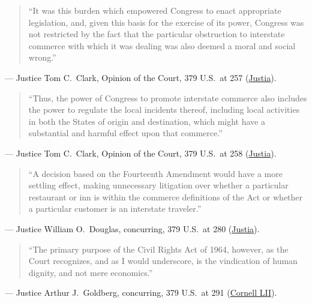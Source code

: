\documentclass[12pt]{article}
\begin{document}
\begin{quote}
``It was this burden which empowered Congress to enact appropriate legislation, and, given this basis for the exercise of its power, Congress was not restricted by the fact that the particular obstruction to interstate commerce with which it was dealing was also deemed a moral and social wrong.''
\end{quote}
\noindent --- Justice Tom C.\ Clark, Opinion of the Court, 379 U.S.\ at 257 (\href{https://supreme.justia.com/cases/federal/us/379/241/}{Justia}).

\begin{quote}
``Thus, the power of Congress to promote interstate commerce also includes the power to regulate the local incidents thereof, including local activities in both the States of origin and destination, which might have a substantial and harmful effect upon that commerce.''
\end{quote}
\noindent --- Justice Tom C.\ Clark, Opinion of the Court, 379 U.S.\ at 258 (\href{https://supreme.justia.com/cases/federal/us/379/241/}{Justia}).

\begin{quote}
``A decision based on the Fourteenth Amendment would have a more settling effect, making unnecessary litigation over whether a particular restaurant or inn is within the commerce definitions of the Act or whether a particular customer is an interstate traveler.''
\end{quote}
\noindent --- Justice William O.\ Douglas, concurring, 379 U.S.\ at 280 (\href{https://supreme.justia.com/cases/federal/us/379/241/}{Justia}).

\begin{quote}
``The primary purpose of the Civil Rights Act of 1964, however, as the Court recognizes, and as I would underscore, is the vindication of human dignity, and not mere economics.''
\end{quote}
\noindent --- Justice Arthur J.\ Goldberg, concurring, 379 U.S.\ at 291 (\href{https://www.law.cornell.edu/supremecourt/text/379/241}{Cornell LII}).
\end{document}
